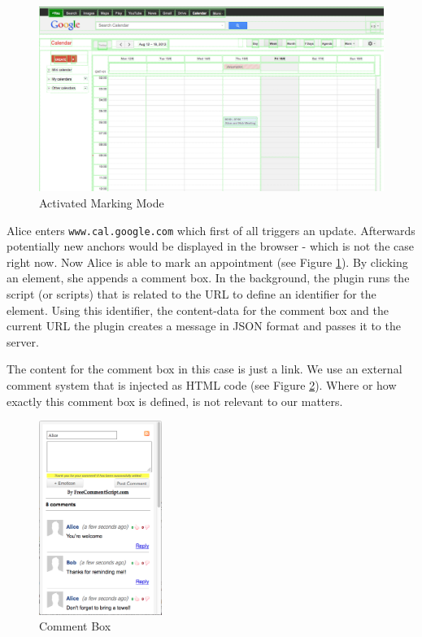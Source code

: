 \begin{figure}\centering
	\includegraphics[width=13cm]{images/gcal-marking-mode.png}
\caption{Activated Marking Mode}
\label{gcal-marking-mode}
\end{figure}

Alice enters \verb+www.cal.google.com+ which first of all triggers an update. Afterwards potentially new anchors would be displayed in the browser - which is not the case right now. 
Now Alice is able to mark an appointment (see Figure \ref{gcal-marking-mode}). By clicking an element, she appends a comment box. 
In the background, the plugin runs the script (or scripts) that is related to the URL to define an identifier for the element. 
Using this identifier, the content-data for the comment box and the current URL the plugin creates a message in JSON format and passes it to the server. 

The content for the comment box in this case is just a link. We use an external comment system that is injected as HTML code (see Figure \ref{gcal-commentbox}). Where or how exactly this comment box is defined, is not relevant to our matters.

\begin{figure}\centering
	\includegraphics[width=4cm]{images/gcal-commentbox.png}
\caption{Comment Box}
\label{gcal-commentbox}
\end{figure}

